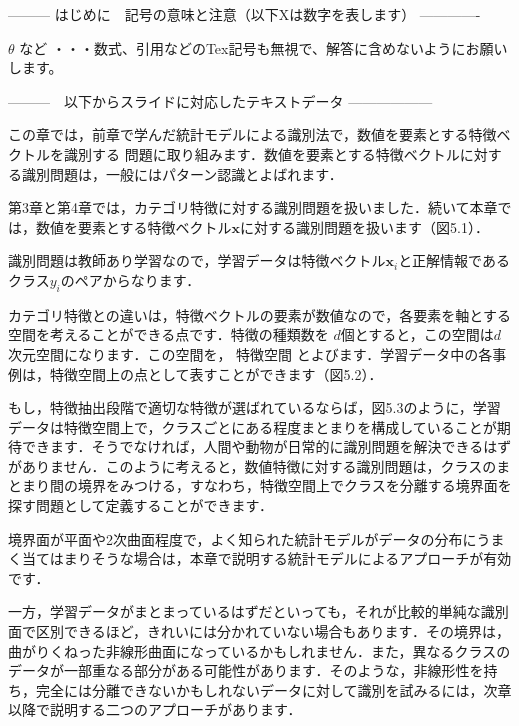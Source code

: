 --------- はじめに　記号の意味と注意（以下Xは数字を表します） -------------

$\theta$ など       ・・・数式、引用などのTex記号も無視で、解答に含めないようにお願いします。
\cite{mitchell97}

---------　以下からスライドに対応したテキストデータ ------------------


この章では，前章で学んだ統計モデルによる識別法で，数値を要素とする特徴ベクトルを識別する
問題に取り組みます．数値を要素とする特徴ベクトルに対する識別問題は，一般にはパターン認識とよばれます．

第3章と第4章では，カテゴリ特徴に対する識別問題を扱いました．続いて本章では，数値を要素とする特徴ベクトル$\bm{x}$に対する識別問題を扱います（図5.1）．


識別問題は教師あり学習なので，学習データは特徴ベクトル$\bm{x}_i$と正解情報であるクラス$y_i$のペアからなります．

カテゴリ特徴との違いは，特徴ベクトルの要素が数値なので，各要素を軸とする空間を考えることができる点です．特徴の種類数を
$d$個とすると，この空間は$d$次元空間になります．この空間を，
特徴空間
とよびます．学習データ中の各事例は，特徴空間上の点として表すことができます（図5.2）．

もし，特徴抽出段階で適切な特徴が選ばれているならば，図5.3のように，学習データは特徴空間上で，クラスごとにある程度まとまりを構成していることが期待できます．そうでなければ，人間や動物が日常的に識別問題を解決できるはずがありません．このように考えると，数値特徴に対する識別問題は，クラスのまとまり間の境界をみつける，すなわち，特徴空間上でクラスを分離する境界面を探す問題として定義することができます．

境界面が平面や2次曲面程度で，よく知られた統計モデルがデータの分布にうまく当てはまりそうな場合は，本章で説明する統計モデルによるアプローチが有効です．

一方，学習データがまとまっているはずだといっても，それが比較的単純な識別面で区別できるほど，きれいには分かれていない場合もあります．その境界は，曲がりくねった非線形曲面になっているかもしれません．また，異なるクラスのデータが一部重なる部分がある可能性があります．そのような，非線形性を持ち，完全には分離できないかもしれないデータに対して識別を試みるには，次章以降で説明する二つのアプローチがあります．

